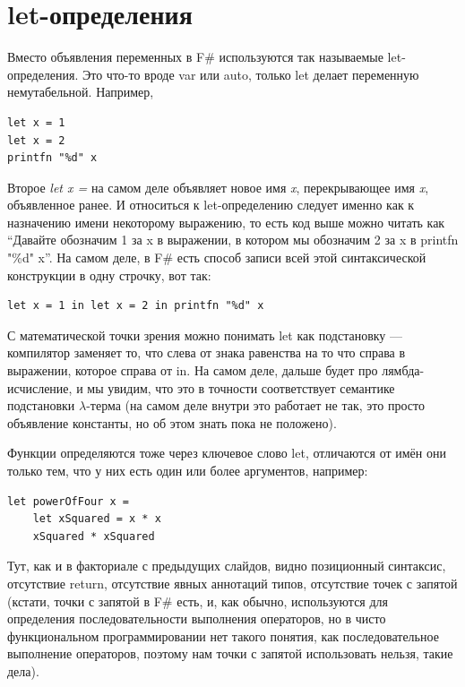 \documentclass[a5paper]{article}
\begin{document}
\section{let-определения}

Вместо объявления переменных в F\# используются так называемые let-определения. Это что-то вроде var или auto, только let делает переменную немутабельной. Например,

\begin{verbatim}
let x = 1
let x = 2
printfn "%d" x
\end{verbatim}

Второе \textit{let x =} на самом деле объявляет новое имя \textit{x}, перекрывающее имя \textit{x}, объявленное ранее. И относиться к let-определению следует именно как к назначению имени некоторому выражению, то есть код выше можно читать как ``Давайте обозначим 1 за x в выражении, в котором мы обозначим 2 за x в printfn "\%d" x''. На самом деле, в F\# есть способ записи всей этой синтаксической конструкции в одну строчку, вот так:

\begin{verbatim}
let x = 1 in let x = 2 in printfn "%d" x
\end{verbatim}

С математической точки зрения можно понимать let как подстановку --- компилятор заменяет то, что слева от знака равенства на то что справа в выражении, которое справа от in. На самом деле, дальше будет про лямбда-исчисление, и мы увидим, что это в точности соответствует семантике подстановки $\lambda$-терма (на самом деле внутри это работает не так, это просто объявление константы, но об этом знать пока не положено).

Функции определяются тоже через ключевое слово let, отличаются от имён они только тем, что у них есть один или более аргументов, например:

\begin{verbatim}
let powerOfFour x =
    let xSquared = x * x
    xSquared * xSquared
\end{verbatim}

Тут, как и в факториале с предыдущих слайдов, видно позиционный синтаксис, отсутствие return, отсутствие явных аннотаций типов, отсутствие точек с запятой (кстати, точки с запятой в F\# есть, и, как обычно, используются для определения последовательности выполнения операторов, но в чисто функциональном программировании нет такого понятия, как последовательное выполнение операторов, поэтому нам точки с запятой использовать нельзя, такие дела).
\end{document}

